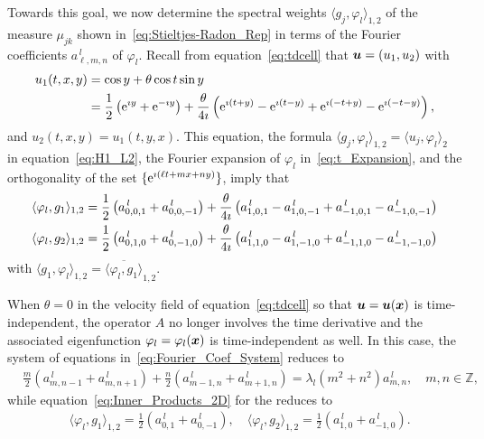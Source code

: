 \documentclass[amsa]{ipart}
\begin{document}
Towards this goal, we now determine the spectral weights $\langle
g_j,\varphi_l\rangle_{1,2}$ of the measure $\mu_{jk}$ shown
in~\eqref{eq:Stieltjes-Radon_Rep} in terms of the Fourier coefficients
$a^{\,l}_{\ell,m,n}$ of $\varphi_l$. Recall from equation~\eqref{eq:tdcell}
that $\boldsymbol{u}=(u_1,u_2)$ with
%
\begin{align}
  u_1(t,x,y)&=\cos{y}+\theta\cos{t}\sin{y}\\ 
           &=\frac{1}{2}\left(\e^{\imath y}+\e^{-\imath y}\right)
            +\frac{\theta}{4\imath}\left(\e^{\imath(t+y)}-\e^{\imath(t-y)}+\e^{\imath(-t+y)}-\e^{\imath(-t-y)}\right),
            \notag
\end{align}
%
and $u_2(t,x,y)=u_1(t,y,x)$. This equation, the formula $\langle
g_j,\varphi_l\rangle_{1,2}=\langle u_j,\varphi_l\rangle_2$ in equation~\eqref{eq:H1_L2}, the Fourier 
expansion of $\varphi_l$ in~\eqref{eq:t_Expansion}, and the orthogonality of
the set $\{\mathrm{e}^{\imath(\ell t+mx+ny)}\}$, imply that
%
\begin{align}\label{eq:Inner_Products_2D}
  \langle\varphi_l,g_1\rangle_{1,2}=\frac{1}{2}\left(a^{\,l}_{0,0,1}+a^{\,l}_{0,0,-1}\right)
               +\frac{\theta}{4\imath}\left(a^{\,l}_{1,0,1}-a^{\,l}_{1,0,-1}+a^{\,l}_{-1,0,1}-a^{\,l}_{-1,0,-1}\right) 
               \\
  \langle\varphi_l,g_2\rangle_{1,2}=\frac{1}{2}\left(a^{\,l}_{0,1,0}+a^{\,l}_{0,-1,0}\right)
               +\frac{\theta}{4\imath}\left(a^{\,l}_{1,1,0}-a^{\,l}_{1,-1,0}+a^{\,l}_{-1,1,0}-a^{\,l}_{-1,-1,0}\right)
               \notag
\end{align}
%
with $\langle g_1,\varphi_l\rangle_{1,2}=\overline{\langle\varphi_l,g_1\rangle}_{1,2}$.



When $\theta=0$ in the velocity field of equation~\eqref{eq:tdcell} so that
$\boldsymbol{u}=\boldsymbol{u}(\boldsymbol{x})$ is time-independent, the
operator $A$ no longer involves the time derivative and the associated
eigenfunction $\varphi_l=\varphi_l(\boldsymbol{x})$ is time-independent as well. In this case, the 
system of equations in~\eqref{eq:Fourier_Coef_System} reduces to
%
\begin{align}\label{eq:Fourier_Coef_System_Steady}
  &\frac{m}{2}(a^{\,l}_{m,n-1}+a^{\,l}_{m,n+1})+\frac{n}{2}(a^{\,l}_{m-1,n}+a^{\,l}_{m+1,n})=\lambda_l(m^2+n^2)a^{\,l}_{m,n},
  \quad m,n\in\mathbb{Z},  
\end{align}
%
while equation~\eqref{eq:Inner_Products_2D} for the reduces to
%
\begin{align}\label{eq:Inner_Products_2D_Steady}
  &\langle\varphi_l,g_1\rangle_{1,2}=\frac{1}{2}\left(a^{\,l}_{0,1}+a^{\,l}_{0,-1}\right),
  \quad
  \langle\varphi_l,g_2\rangle_{1,2}=\frac{1}{2}\left(a^{\,l}_{1,0}+a^{\,l}_{-1,0}\right).
\end{align}
%
\end{document}
